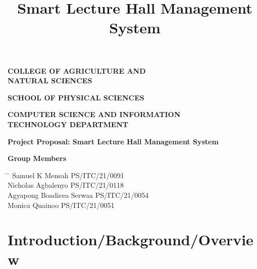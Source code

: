 \documentclass[12pt]{article}
\title{Smart Lecture Hall Management System}
\date{}
\begin{document}
\begin{titlepage}
    \begin{center}
        \vspace*{2cm}
        
        \textbf{\Huge COLLEGE OF AGRICULTURE AND \newline \\ NATURAL SCIENCES}
        
        \vspace{0.5cm}
        
        \textbf{\Large SCHOOL OF PHYSICAL SCIENCES}
        
        \vspace{0.5cm}
        
        \textbf{\large COMPUTER SCIENCE AND INFORMATION \\ TECHNOLOGY DEPARTMENT}
        
        \vspace{2cm}
        
        \textbf{\large Project Proposal: Smart Lecture Hall Management System}
        
        \vspace{2cm}
         \begin{center}
                \textbf{\large Group Members}
                
                \vspace{0.5cm}
                \begin{tabbing}
    \hspace{4cm} \= \hspace{5cm} \= \kill
    \> Samuel K Mensah \> PS/ITC/21/0091 \\
    \> Nicholas Agbalenyo \> PS/ITC/21/0118 \\
    \> Agyapong Boadicea Serwaa \> PS/ITC/21/0054 \\
    \> Monica Quainoo \> PS/ITC/21/0051 \\
\end{tabbing}
                
                \vfill
            \end{center}
        
    \end{center}
\end{titlepage}


\section*{Introduction/Background/Overview}
\end{document}
